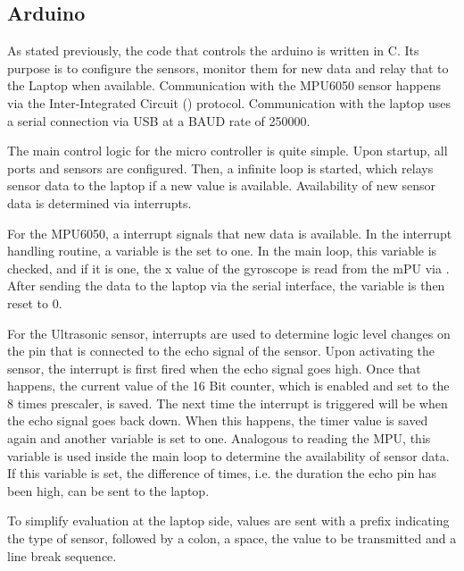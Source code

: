 \subsection{Arduino}
\label{subsec:arduino}

As stated previously, the code that controls the arduino is written in C.
Its purpose is to configure the sensors, monitor them for new data and relay that to the Laptop when available.
Communication with the MPU6050 sensor happens via the Inter-Integrated Circuit (\IIC) protocol.
Communication with the laptop uses a serial connection via USB at a BAUD rate of 250000.


The main control logic for the micro controller is quite simple. Upon startup, all ports and sensors are configured.
Then, a infinite loop is started, which relays sensor data to the laptop if a new value is available.
Availability of new sensor data is determined via interrupts.

For the MPU6050, a interrupt signals that new data is available. In the interrupt handling routine, a variable is the set to one.
In the main loop, this variable is checked, and if it is one, the x value of the gyroscope is read from the mPU via \IIC.
After sending the data to the laptop via the serial interface, the variable is then reset to 0.

For the Ultrasonic sensor, interrupts are used to determine logic level changes on the pin that is connected to the echo signal of the sensor.
Upon activating the sensor, the interrupt is first fired when the echo signal goes high.
Once that happens, the current value of the 16 Bit counter, which is enabled and set to the 8 times prescaler, is saved.
The next time the interrupt is triggered will be when the echo signal goes back down.
When this happens, the timer value is saved again and another variable is set to one. Analogous to reading the MPU,
this variable is used inside the main loop to determine the availability of sensor data. If this variable is set,
the difference of times, i.e. the duration the echo pin has been high, can be sent to the laptop.

To simplify evaluation at the laptop side, values are sent with a prefix indicating the type of sensor,
followed by a colon, a space, the value to be transmitted and a line break sequence.
